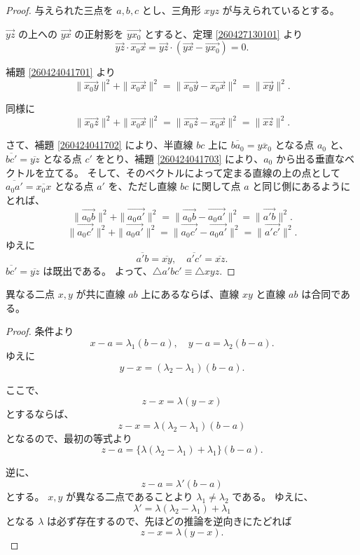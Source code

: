 \begin{proof}
  与えられた三点を \(a,b,c\) とし、三角形 \(xyz\) が与えられているとする。

  \(\overrightarrow{yz}\) の上への \(\overrightarrow{yx}\) の正射影を \(\overrightarrow{yx_0}\) とすると、定理 \ref{260427130101} より
  \[\overrightarrow{yz}\cdot\overrightarrow{x_0x}=\overrightarrow{yz}\cdot(\overrightarrow{yx}-\overrightarrow{yx_0})=0.\]

  補題 \ref{260424041701} より
  \[\|\overrightarrow{x_0y}\|^2+\|\overrightarrow{x_0x}\|^2=\|\overrightarrow{x_0y}-\overrightarrow{x_0x}\|^2=\|\overrightarrow{xy}\|^2.\]

  同様に
  \[\|\overrightarrow{x_0z}\|^2+\|\overrightarrow{x_0x}\|^2=\|\overrightarrow{x_0z}-\overrightarrow{x_0x}\|^2=\|\overrightarrow{xz}\|^2.\]

  さて、補題 \ref{260424041702} により、半直線 \(bc\) 上に \(\overline{ba_0}=\overline{yx_0}\) となる点 \(a_0\) と、\(\overline{bc'}=\overline{yz}\) となる点 \(c'\) をとり、補題 \ref{260424041703} により、\(a_0\) から出る垂直なベクトルを立てる。
  そして、そのベクトルによって定まる直線の上の点として \(\overline{a_0a'}=\overline{x_0x}\) となる点 \(a'\) を、ただし直線 \(bc\) に関して点 \(a\) と同じ側にあるようにとれば、
  \[\|\overrightarrow{a_0b}\|^2+\|\overrightarrow{a_0a'}\|^2=\|\overrightarrow{a_0b}-\overrightarrow{a_0a'}\|^2=\|\overrightarrow{a'b}\|^2.\]
  \[\|\overrightarrow{a_0c'}\|^2+\|\overrightarrow{a_0a'}\|^2=\|\overrightarrow{a_0c'}-\overrightarrow{a_0a'}\|^2=\|\overrightarrow{a'c'}\|^2.\]
  ゆえに
  \[\overline{a'b}=\overline{xy},\quad \overline{a'c'}=\overline{xz}.\]
  \(\overline{bc'}=\overline{yz}\) は既出である。
  よって、\(\triangle a'bc'\equiv\triangle xyz.\)
\end{proof}


\begin{lmm}\label{260424111401}
  異なる二点 \(x,y\) が共に直線 \(ab\) 上にあるならば、直線 \(xy\) と直線 \(ab\) は合同である。
\end{lmm}

\begin{proof}
  条件より
  \[x-a=\lambda_1(b-a),\quad y-a=\lambda_2(b-a).\]
  ゆえに
  \[y-x=(\lambda_2-\lambda_1)(b-a).\]

  ここで、
  \[z-x=\lambda(y-x)\]
  とするならば、
  \[z-x=\lambda(\lambda_2-\lambda_1)(b-a)\]
  となるので、最初の等式より
  \[z-a=\{\lambda(\lambda_2-\lambda_1)+\lambda_1\}(b-a).\]

  逆に、
  \[z-a=\lambda'(b-a)\]
  とする。
  \(x,y\) が異なる二点であることより \(\lambda_1\neq\lambda_2\) である。
  ゆえに、
  \[\lambda'=\lambda(\lambda_2-\lambda_1)+\lambda_1\]
  となる \(\lambda\) は必ず存在するので、先ほどの推論を逆向きにたどれば
  \[z-x=\lambda(y-x).\]
\end{proof}

